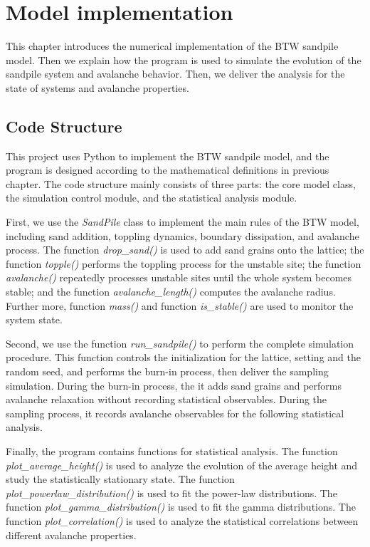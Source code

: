 \chapter{Model implementation}

This chapter introduces the numerical implementation of the BTW sandpile model. Then we explain how the program is used to simulate the evolution of the sandpile system and avalanche behavior. Then, we deliver the analysis for the state of systems and avalanche properties. 

\section{Code Structure}

This project uses Python to implement the BTW sandpile model, and the program is designed according to the mathematical definitions in previous chapter. The code structure mainly consists of three parts: the core model class, the simulation control module, and the statistical analysis module. 

First, we use the \textit{SandPile} class to implement the main rules of the BTW model, including sand addition, toppling dynamics, boundary dissipation, and avalanche process. The function \textit{drop\_sand()} is used to add sand grains onto the lattice; the function \textit{topple()} performs the toppling process for the unstable site; the function \textit{avalanche()} repeatedly processes unstable sites until the whole system becomes stable; and the function \textit{avalanche\_length()} computes the avalanche radius. Further more, function \textit{mass()} and function \textit{is\_stable()} are used to monitor the system state. 

Second, we use the function \textit{run\_sandpile()} to perform the complete simulation procedure. This function controls the initialization for the lattice, setting and the random seed, and performs the burn-in process, then deliver the sampling simulation. During the burn-in process, the it adds sand grains and performs avalanche relaxation without recording statistical observables. During the sampling process, it records avalanche observables for the following statistical analysis.

Finally, the program contains functions for statistical analysis. The function \textit{plot\_average\_height()} is used to analyze the evolution of the average height and study the statistically stationary state. The function \textit{plot\_powerlaw\_distribution()} is used to fit the power-law distributions. The function \textit{plot\_gamma\_distribution()} is used to fit the gamma distributions. The function \textit{plot\_correlation()} is used to analyze the statistical correlations between different avalanche properties.



